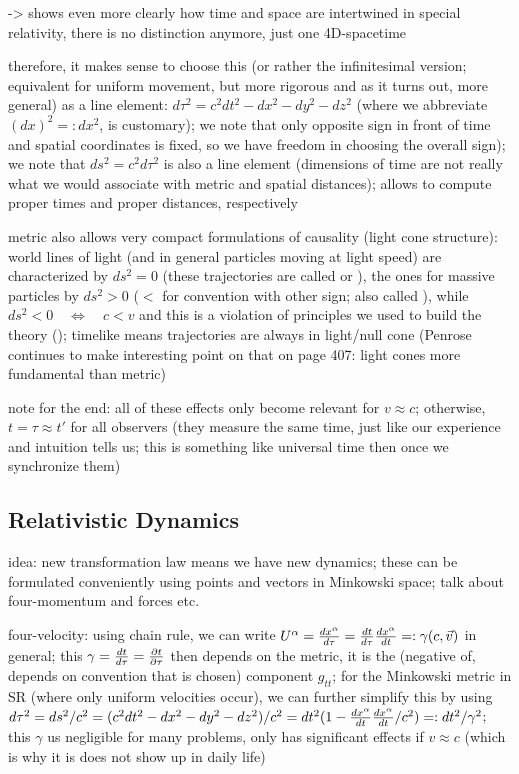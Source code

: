 -> shows even more clearly how time and space are intertwined in special relativity, there is no distinction anymore, just one 4D-spacetime


therefore, it makes sense to choose this (or rather the infinitesimal version; equivalent for uniform movement, but more rigorous and as it turns out, more general) as a line element: $d\tau^2 = c^2 dt^2 - dx^2 - dy^2 - dz^2$ (where we abbreviate $(dx)^2 =: dx^2$, is customary); we note that only opposite sign in front of time and spatial coordinates is fixed, so we have freedom in choosing the overall sign); we note that $ds^2 = c^2 d\tau^2$ is also a line element (dimensions of time are not really what we would associate with metric and spatial distances); allows to compute proper times and proper distances, respectively


metric also allows very compact formulations of causality (light cone structure): world lines of light (and in general particles moving at light speed) are characterized by $ds^2 = 0$ (these trajectories are called  or ), the ones for massive particles by $ds^2 > 0$ ($<$ for convention with other sign; also called ), while $ds^2 < 0 \quad \Leftrightarrow \quad c < v$ and this is a violation of principles we used to build the theory (); timelike means trajectories are always in light/null cone (Penrose continues to make interesting point on that on page 407: light cones more fundamental than metric)



note for the end: all of these effects only become relevant for $v \approx c$; otherwise, $t = \tau \approx t'$ for all observers (they measure the same time, just like our experience and intuition tells us; this is something like universal time then once we synchronize them)




		\subsection{Relativistic Dynamics}
idea: new transformation law means we have new dynamics; these can be formulated conveniently using points and vectors in Minkowski space; talk about four-momentum and forces etc.



four-velocity: using chain rule, we can write $U^\alpha = \dv{x^\alpha}{\tau} = \dv{t}{\tau} \dv{x^\alpha}{t} =: \gamma (c, \vec{v})$ in general; this $\gamma = \dv{t}{\tau} = \pdv{t}{\tau}$ then depends on the metric, it is the (negative of, depends on convention that is chosen) component $g_{tt}$; for the Minkowski metric in SR (where only uniform velocities occur), we can further simplify this by using $d\tau^2 = ds^2 / c^2 = (c^2 dt^2 - dx^2 - dy^2 - dz^2) / c^2 = dt^2 (1 - \dv{x^\alpha}{t} \dv{x^\alpha}{t} / c^2) =: dt^2 / \gamma^2$; this $\gamma$ us negligible for many problems, only has significant effects if $v \approx c$ (which is why it is does not show up in daily life)



